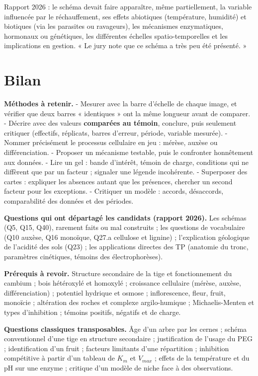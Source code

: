 \documentclass[11pt,a4paper]{article}
\begin{document}
\begin{jury}

Rapport 2026 : le schéma devait faire apparaître, même partiellement, la variable influencée par le réchauffement, ses effets abiotiques (température, humidité) et biotiques (via les parasites ou ravageurs), les mécanismes enzymatiques, hormonaux ou génétiques, les différentes échelles spatio-temporelles et les implications en gestion. « Le jury note que ce schéma a très peu été présenté. »

\end{jury}

\hypertarget{bilan}{%
\section{Bilan}\label{bilan}}

\textbf{Méthodes à retenir.}
- Mesurer avec la barre d'échelle de chaque image, et vérifier que deux barres « identiques » ont la même longueur avant de comparer.
- Décrire avec des valeurs \textbf{comparées au témoin}, conclure, puis seulement critiquer (effectifs, réplicats, barres d'erreur, période, variable mesurée).
- Nommer précisément le processus cellulaire en jeu : mérèse, auxèse ou différenciation.
- Proposer un mécanisme testable, puis le confronter honnêtement aux données.
- Lire un gel : bande d'intérêt, témoin de charge, conditions qui ne diffèrent que par un facteur ; signaler une légende incohérente.
- Superposer des cartes : expliquer les absences autant que les présences, chercher un second facteur pour les exceptions.
- Critiquer un modèle : accords, désaccords, comparabilité des données et des périodes.

\textbf{Questions qui ont départagé les candidats (rapport 2026).} Les schémas (Q5, Q15, Q40), rarement faits ou mal construits ; les questions de vocabulaire (Q10 auxèse, Q16 monoïque, Q27.a cellulose et lignine) ; l'explication géologique de l'acidité des sols (Q23) ; les applications directes des TP (anatomie du tronc, paramètres cinétiques, témoins des électrophorèses).

\textbf{Prérequis à revoir.} Structure secondaire de la tige et fonctionnement du cambium ; bois hétéroxylé et homoxylé ; croissance cellulaire (mérèse, auxèse, différenciation) ; potentiel hydrique et osmose ; inflorescence, fleur, fruit, monoïcie ; altération des roches et complexe argilo-humique ; Michaelis-Menten et types d'inhibition ; témoins positifs, négatifs et de charge.

\textbf{Questions classiques transposables.} Âge d'un arbre par les cernes ; schéma conventionnel d'une tige en structure secondaire ; justification de l'usage du PEG ; identification d'un fruit ; facteurs limitants d'une répartition ; inhibition compétitive à partir d'un tableau de \(K_m\) et \(V_{max}\) ; effets de la température et du pH sur une enzyme ; critique d'un modèle de niche face à des observations.
\end{document}

